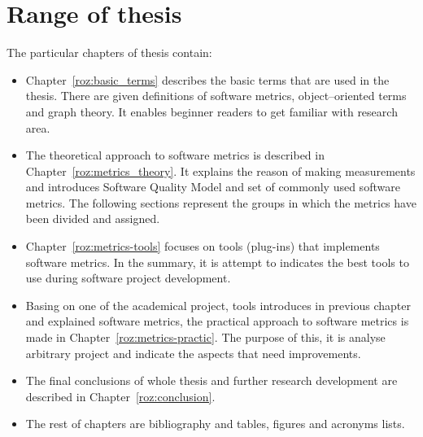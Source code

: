 \section{Range of thesis}
The particular chapters of thesis contain:

\begin{itemize}
\item Chapter~\ref{roz:basic_terms} describes the basic terms that are used in the thesis. There are given definitions of software metrics, object--oriented terms and graph theory. It enables beginner readers to get familiar with research area. 
\item The theoretical approach to software metrics is described in Chapter~\ref{roz:metrics_theory}. It explains the reason of making measurements and introduces Software Quality Model and set of commonly used software metrics. The following sections represent the groups in which the metrics have been divided and assigned. 
\item Chapter~\ref{roz:metrics-tools} focuses on tools (plug-ins) that implements software metrics. In the summary, it is attempt to indicates the best tools to use during software project development. 
\item Basing on one of the academical project, tools introduces in previous chapter and explained software metrics, the practical approach to software metrics is made in Chapter~\ref{roz:metrics-practic}. The purpose of this, it is analyse arbitrary project and indicate the aspects that need improvements. 
\item The final conclusions of whole thesis and further research development are described in Chapter~\ref{roz:conclusion}.  
\item The rest of chapters are bibliography and tables, figures and acronyms lists.
\end{itemize}